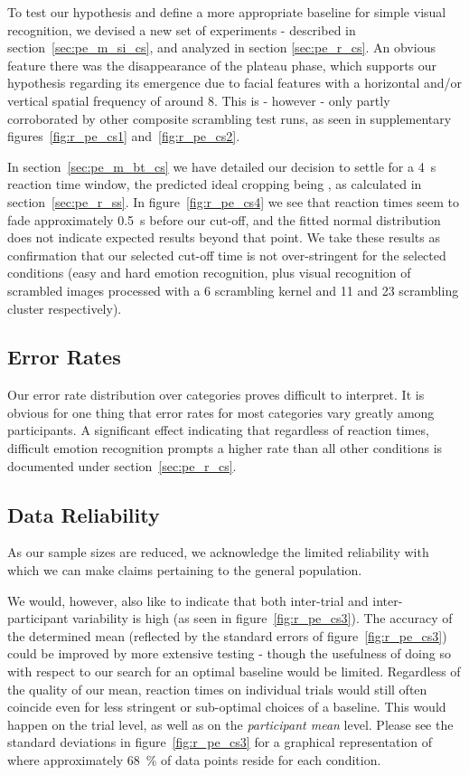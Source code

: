 	    To test our hypothesis and define a more appropriate baseline for simple visual recognition, we devised a new set of experiments - described in section~\ref{sec:pe_m_si_cs}, and analyzed in section \ref{sec:pe_r_cs}.
	    An obvious feature there was the disappearance of the plateau phase, which supports our hypothesis regarding its emergence due to facial features with a horizontal and/or vertical spatial frequency of around \SI{8}{\pixel}.
	    This is - however - only partly corroborated by other composite scrambling test runs, as seen in supplementary figures~\ref{fig:r_pe_cs1} and~\ref{fig:r_pe_cs2}.
	    
	    In section~\ref{sec:pe_m_bt_cs} we have detailed our decision to settle for a \SI{4}{\second} reaction time window, the predicted ideal cropping being , as calculated in section~\ref{sec:pe_r_ss}.
	    In figure~\ref{fig:r_pe_cs4} we see that reaction times seem to fade approximately \SI{0.5}{\second} before our cut-off, and the fitted normal distribution does not indicate expected results beyond that point.
	    We take these results as confirmation that our selected cut-off time is not over-stringent for the selected conditions (easy and hard emotion recognition, plus visual recognition of scrambled images processed with a \SI{6}{\pixel} scrambling kernel and \SI{11}{\pixel} and \SI{23}{\pixel} scrambling cluster respectively).
	\subsection{Error Rates}
	    Our error rate distribution over categories proves difficult to interpret.
	    It is obvious for one thing that error rates for most categories vary greatly among participants.
	    A significant effect indicating that regardless of reaction times, difficult emotion recognition prompts a higher rate than all other conditions is documented under section~\ref{sec:pe_r_cs}.
	\subsection{Data Reliability}
	    As our sample sizes are reduced, we acknowledge the limited reliability with which we can make claims pertaining to the general population. 
	
	    We would, however, also like to indicate that both inter-trial and inter-participant variability is high (as seen in figure~\ref{fig:r_pe_cs3}).
	    The accuracy of the determined mean (reflected by the standard errors of figure~\ref{fig:r_pe_cs3}) could be improved by more extensive testing - though the usefulness of doing so with respect to our search for an optimal baseline would be limited.
	    Regardless of the quality of our mean, reaction times on individual trials would still often coincide even for less stringent or sub-optimal choices of a baseline.  
	    This would happen on the trial level, as well as on the \textit{participant mean} level.
	    Please see the standard deviations in figure~\ref{fig:r_pe_cs3} for a graphical representation of where approximately \SI{68}{\percent} of data points reside for each condition.
